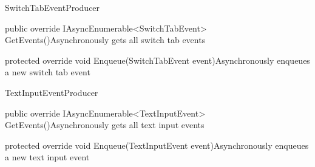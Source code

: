 \begin{class}{SwitchTabEventProducer} 
    


    \begin{methods}
        \begin{method}{public override IAsyncEnumerable<SwitchTabEvent> GetEvents()}{Asynchronously gets all switch tab events}
        \end{method}
        \begin{method}{ protected override void Enqueue(SwitchTabEvent event)}{Asynchronously enqueues a new switch tab event}
            \begin{parameters}
            \end{parameters}
        \end{method}
    \end{methods}
\end{class}

\begin{class}{TextInputEventProducer} 
    


    \begin{methods}
        \begin{method}{public override IAsyncEnumerable<TextInputEvent> GetEvents()}{Asynchronously gets all text input events}
        \end{method}
        \begin{method}{ protected override void Enqueue(TextInputEvent event)}{Asynchronously enqueues a new text input event}
            \begin{parameters}
            \end{parameters}
        \end{method}
    \end{methods}
\end{class}

